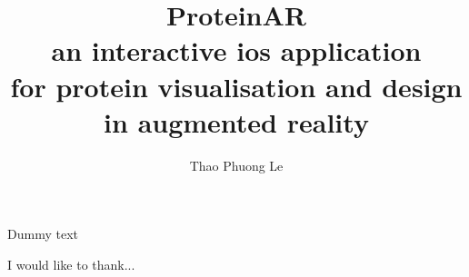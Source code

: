 \documentclass[MSCIM]{mscim}
\begin{document}

\title{\textbf{ProteinAR} \\an interactive ios application\\for protein visualisation and design in augmented reality}

\author{Thao Phuong Le}

\beforeabstract

Dummy text

\afterabstract


 I would like to thank...
 
 
\afterpreface

















\printbibliography
\end{document}
